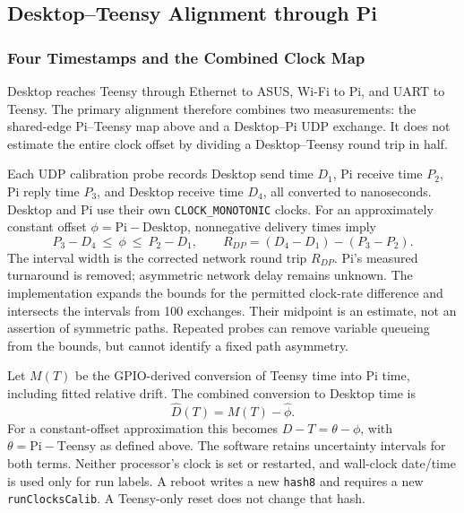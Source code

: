 \subsection{Desktop--Teensy Alignment through Pi}
\label{sec:desktop-clock}
\subsubsection{Four Timestamps and the Combined Clock Map}
Desktop reaches Teensy through Ethernet to ASUS, Wi-Fi to Pi, and UART to Teensy. The primary alignment therefore combines two measurements: the shared-edge Pi--Teensy map above and a Desktop--Pi UDP exchange. It does not estimate the entire clock offset by dividing a Desktop--Teensy round trip in half.

Each UDP calibration probe records Desktop send time $D_1$, Pi receive time $P_2$, Pi reply time $P_3$, and Desktop receive time $D_4$, all converted to nanoseconds. Desktop and Pi use their own \texttt{CLOCK\_MONOTONIC} clocks. For an approximately constant offset $\phi=\text{Pi}-\text{Desktop}$, nonnegative delivery times imply
\begin{equation}
 P_3-D_4\ \leq\ \phi\ \leq\ P_2-D_1,
 \qquad R_{DP}=(D_4-D_1)-(P_3-P_2).
 \label{eq:desktop-pi-bounds}
\end{equation}
The interval width is the corrected network round trip $R_{DP}$. Pi's measured turnaround is removed; asymmetric network delay remains unknown. The implementation expands the bounds for the permitted clock-rate difference and intersects the intervals from 100 exchanges. Their midpoint is an estimate, not an assertion of symmetric paths. Repeated probes can remove variable queueing from the bounds, but cannot identify a fixed path asymmetry.

Let $M(T)$ be the GPIO-derived conversion of Teensy time into Pi time, including fitted relative drift. The combined conversion to Desktop time is
\begin{equation}
 \widehat D(T)=M(T)-\widehat\phi.
 \label{eq:desktop-teensy-map}
\end{equation}
For a constant-offset approximation this becomes $D-T=\theta-\phi$, with $\theta=\text{Pi}-\text{Teensy}$ as defined above. The software retains uncertainty intervals for both terms. Neither processor's clock is set or restarted, and wall-clock date/time is used only for run labels. A reboot writes a new \texttt{hash8} and requires a new \texttt{runClocksCalib}. A Teensy-only reset does not change that hash.

